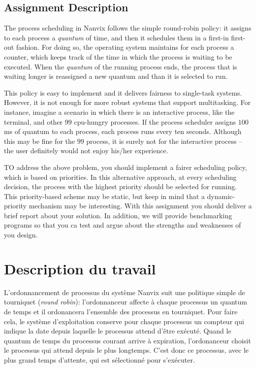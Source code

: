 \documentclass[11pt]{article}
\newif\iffr
\begin{document}
	\subsection*{Assignment Description}

		The process scheduling in Nanvix follows the simple round-robin
		policy: it assigns to each process a \textit{quantum} of time, and
		then it schedules them in a first-in first-out fashion. For
		doing so, the operating system maintains for each process a
		counter, which keeps track of the time in which the process is
		waiting to be executed. When the \textit{quantum} of the running
		process ends, the process that is waiting longer is reassigned a
		new quantum and than it is selected to run.

		This policy is easy to implement and it delivers fairness to
		single-task systems. However, it is not enough for more robust
		systems that support multitasking. For instance, imagine a
		scenario in which there is an interactive process, like the
		terminal, and other $99$ cpu-hungry processes. If the process
		scheduler assigns $100$ ms of quantum to each process, each
		process runs every ten seconds. Although this may be fine for
		the $99$ process, it is surely not for the interactive process
		-- the user definitely would not enjoy his/her experience.

		TO address the above problem, you should implement a fairer
		scheduling policy, which is based on priorities. In this
		alternative approach, at every scheduling decision, the process
		with the highest priority should be selected for running. This
		priority-based scheme may be static, but keep in mind that a
		dynamic-priority mechanism may be interesting. With this
		assignment you should deliver a brief report about your
		solution. In addition, we will provide benchmarking programs so that
		you ca test and argue about the strengths and weaknesses of you
		design.
\else\iffr
	\section*{Description du travail}

		L'ordonnancement de processus du système Nanvix suit une politique
		simple de tourniquet ({\em round robin}): l'ordonnanceur affecte
		à chaque processus un quantum de temps et il ordonancera l'ensemble
		des processus en tourniquet. Pour faire cela, le système d'exploitation
		conserve pour chaque processus un compteur qui indique la date depuis
		laquelle le processus attend d'être exécuté. Quand le quantum
		de temps du processus courant arrive à expiration, l'ordonanceur
		choisit le processus qui attend depuis le plus longtemps. C'est donc
		ce processus, avec le plus grand temps d'attente,  qui est sélectionné
		pour s'exécuter.
\end{document}
